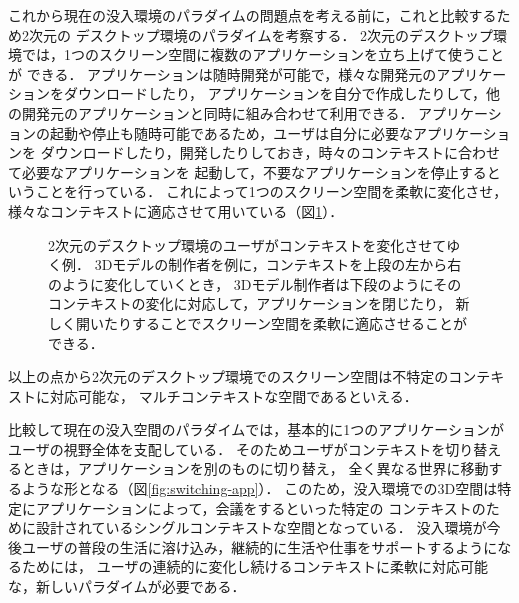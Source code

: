 これから現在の没入環境のパラダイムの問題点を考える前に，これと比較するため2次元の
デスクトップ環境のパラダイムを考察する．
2次元のデスクトップ環境では，1つのスクリーン空間に複数のアプリケーションを立ち上げて使うことが
できる．
アプリケーションは随時開発が可能で，様々な開発元のアプリケーションをダウンロードしたり，
アプリケーションを自分で作成したりして，他の開発元のアプリケーションと同時に組み合わせて利用できる．
アプリケーションの起動や停止も随時可能であるため，ユーザは自分に必要なアプリケーションを
ダウンロードしたり，開発したりしておき，時々のコンテキストに合わせて必要なアプリケーションを
起動して，不要なアプリケーションを停止するということを行っている．
これによって1つのスクリーン空間を柔軟に変化させ，様々なコンテキストに適応させて用いている（図\ref{fig:context-switch}）．

\begin{figure}[htbp]
  \centering
  \caption{
    2次元のデスクトップ環境のユーザがコンテキストを変化させてゆく例．
    3Dモデルの制作者を例に，コンテキストを上段の左から右のように変化していくとき，
    3Dモデル制作者は下段のようにそのコンテキストの変化に対応して，アプリケーションを閉じたり，
    新しく開いたりすることでスクリーン空間を柔軟に適応させることができる．
  }
  \label{fig:context-switch}
\end{figure}

以上の点から2次元のデスクトップ環境でのスクリーン空間は不特定のコンテキストに対応可能な，
マルチコンテキストな空間であるといえる．

比較して現在の没入空間のパラダイムでは，基本的に1つのアプリケーションがユーザの視野全体を支配している．
そのためユーザがコンテキストを切り替えるときは，アプリケーションを別のものに切り替え，
全く異なる世界に移動するような形となる（図\ref{fig:switching-app}）．
このため，没入環境での3D空間は特定にアプリケーションによって，会議をするといった特定の
コンテキストのために設計されているシングルコンテキストな空間となっている．
没入環境が今後ユーザの普段の生活に溶け込み，継続的に生活や仕事をサポートするようになるためには，
ユーザの連続的に変化し続けるコンテキストに柔軟に対応可能な，新しいパラダイムが必要である．

